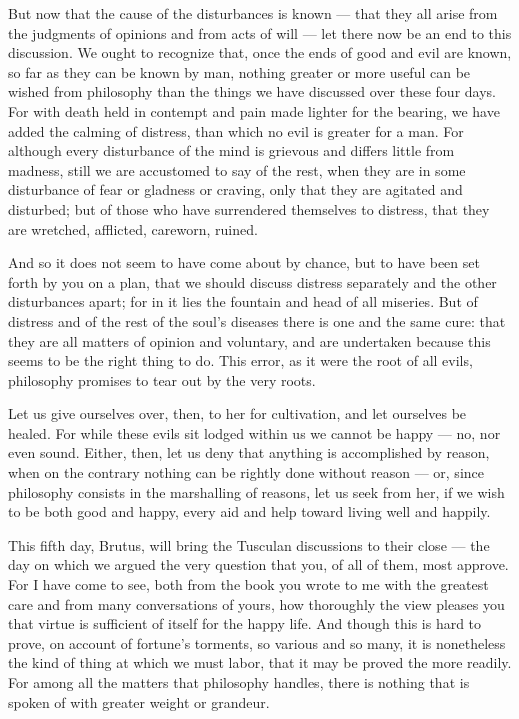  But now that the cause of the disturbances is known — that they all arise from the judgments of opinions and from acts of will — let there now be an end to this discussion. We ought to recognize that, once the ends of good and evil are known, so far as they can be known by man, nothing greater or more useful can be wished from philosophy than the things we have discussed over these four days. For with death held in contempt and pain made lighter for the bearing, we have added the calming of distress, than which no evil is greater for a man. For although every disturbance of the mind is grievous and differs little from madness, still we are accustomed to say of the rest, when they are in some disturbance of fear or gladness or craving, only that they are agitated and disturbed; but of those who have surrendered themselves to distress, that they are wretched, afflicted, careworn, ruined.

 And so it does not seem to have come about by chance, but to have been set forth by you on a plan, that we should discuss distress separately and the other disturbances apart; for in it lies the fountain and head of all miseries. But of distress and of the rest of the soul's diseases there is one and the same cure: that they are all matters of opinion and voluntary, and are undertaken because this seems to be the right thing to do. This error, as it were the root of all evils, philosophy promises to tear out by the very roots.

 Let us give ourselves over, then, to her for cultivation, and let ourselves be healed. For while these evils sit lodged within us we cannot be happy — no, nor even sound. Either, then, let us deny that anything is accomplished by reason, when on the contrary nothing can be rightly done without reason — or, since philosophy consists in the marshalling of reasons, let us seek from her, if we wish to be both good and happy, every aid and help toward living well and happily.


 This fifth day, Brutus, will bring the Tusculan discussions to their close — the day on which we argued the very question that you, of all of them, most approve. For I have come to see, both from the book you wrote to me with the greatest care and from many conversations of yours, how thoroughly the view pleases you that virtue is sufficient of itself for the happy life. And though this is hard to prove, on account of fortune's torments, so various and so many, it is nonetheless the kind of thing at which we must labor, that it may be proved the more readily. For among all the matters that philosophy handles, there is nothing that is spoken of with greater weight or grandeur.

